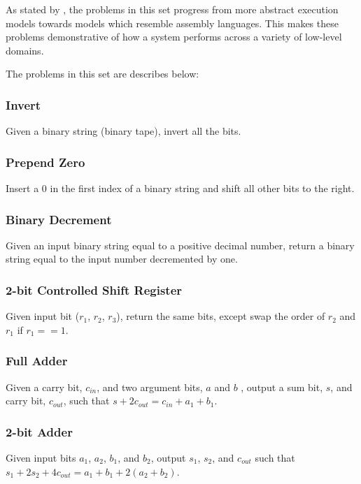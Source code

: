 As stated by \cite{Gaunt2016}, the problems in this set progress from more abstract execution models towards models which resemble assembly languages. This makes these problems demonstrative of how a system performs across a variety of low-level domains. 
 
The problems in this set are describes below:

\subsubsection{Invert}

Given a binary string (binary tape), invert all the bits.

\subsubsection{Prepend Zero}

Insert a $0$ in the first index of a binary string and shift all other bits to the right.

\subsubsection{Binary Decrement}

Given an input binary string equal to a positive decimal number, return a binary string equal to the input number decremented by one.

\subsubsection{2-bit Controlled Shift Register}

Given input bit ($r_1$, $r_2$, $r_3$), return the same bits, except swap the order of $r_2$ and $r_1$ if $r_1 == 1$.

\subsubsection{Full Adder}

Given a carry bit, $c_{in}$, and two argument bits, $a$ and $b$ , output a sum bit, $s$, and carry bit, $c_{out}$, such that  $s + 2c_{out} = c_{in} + a_1 + b_1$.

\subsubsection{2-bit Adder}

Given input bits $a_1$, $a_2$, $b_1$, and $b_2$, output $s_1$, $s_2$, and $c_{out}$ such that  $s_1 + 2s_2 + 4c_{out} = a_1 + b_1 + 2(a_2 + b_2)$.

